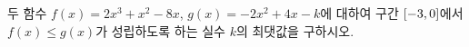두 함수 $f(x)=2x^3+x^2-8x$, $g(x)=-2x^2+4x-k$에 대하여 구간 $[-3{,}\mkern3mu\mathopen{}0]$에서 $f(x)\le g(x)$가 성립하도록 하는 실수 $k$의 최댓값을 구하시오.

